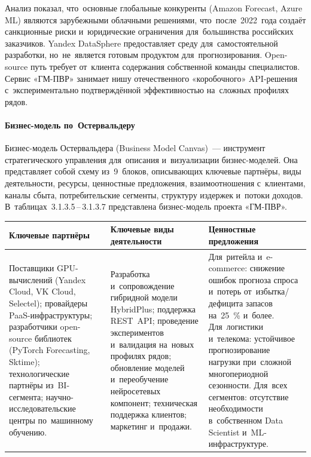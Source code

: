 Анализ показал, что~основные глобальные конкуренты (Amazon Forecast, Azure ML)
являются зарубежными облачными решениями, что~после~2022~года создаёт
санкционные риски и~юридические ограничения для~большинства российских
заказчиков. Yandex DataSphere предоставляет среду для~самостоятельной
разработки, но~не~является готовым продуктом для~прогнозирования. Open-source
путь требует от~клиента содержания собственной команды специалистов. Сервис
«ГМ-ПВР» занимает нишу отечественного «коробочного» API-решения
с~экспериментально подтверждённой эффективностью на~сложных профилях рядов.

\paragraph{Бизнес-модель по~Остервальдеру}

Бизнес-модель Остервальдера (Business Model Canvas)~--- инструмент
стратегического управления для~описания и~визуализации бизнес-моделей. Она
представляет собой схему из~9~блоков, описывающих ключевые партнёры, виды
деятельности, ресурсы, ценностные предложения, взаимоотношения с~клиентами,
каналы сбыта, потребительские сегменты, структуру издержек и~потоки доходов.
В~таблицах~3.1.3.5\,--\,3.1.3.7 представлена бизнес-модель проекта «ГМ-ПВР».

{\footnotesize
\begin{longtable}{L{5.0cm} L{5.0cm} L{5.0cm}}
\toprule
\textbf{Ключевые партнёры} & \textbf{Ключевые виды деятельности} & \textbf{Ценностные предложения} \\
\midrule
\endhead
Поставщики GPU-вычислений (Yandex Cloud, VK Cloud, Selectel); провайдеры PaaS-инфраструктуры; разработчики open-source библиотек (PyTorch Forecasting, Sktime); технологические партнёры из~BI-сегмента; научно-исследовательские центры по~машинному обучению. & Разработка и~сопровождение гибридной модели HybridPlus; поддержка REST~API; проведение экспериментов и~валидация на~новых профилях рядов; обновление моделей и~переобучение нейросетевых компонент; техническая поддержка клиентов; маркетинг и~продажи. & Для~ритейла и~e-commerce: снижение ошибок прогноза спроса и~потерь от~избытка/дефицита запасов на~25~\% и~более. Для~логистики и~телекома: устойчивое прогнозирование нагрузки при~сложной многопериодной сезонности. Для~всех сегментов: отсутствие необходимости в~собственном Data Scientist и~ML-инфраструктуре. \\
\bottomrule
\end{longtable}
}

